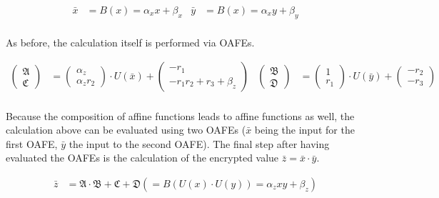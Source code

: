 \begin{align*}
  \bar{x} & = B(x) = \alpha_x x + \beta_x &
  \bar{y} & = B(x) = \alpha_x y + \beta_y \\
\end{align*}

\noindent{}As before, the calculation itself is performed via OAFEs.

\begin{align*}
\begin{pmatrix}\mathfrak{A}\\\mathfrak{C}\end{pmatrix} & =
\begin{pmatrix}\alpha_z\\\alpha_z r_2\end{pmatrix} \cdot U(\bar{x}) +
\begin{pmatrix}-r_1\\-r_1r_2+r_3+\beta_z\end{pmatrix} &
\begin{pmatrix}\mathfrak{B}\\\mathfrak{D}\end{pmatrix} & =
\begin{pmatrix}1\\r_1\end{pmatrix} \cdot U(\bar{y}) +
\begin{pmatrix}-r_2\\-r_3\end{pmatrix}\\
\end{align*}

\noindent{}Because the composition of affine functions leads to affine functions
as well, the calculation above can be evaluated using two OAFEs ($\bar{x}$ being
the input for the first OAFE, $\bar{y}$ the input to the second OAFE). The final
step after having evaluated the OAFEs is the calculation of the encrypted value
$\bar{z} = \bar{x} \cdot \bar{y}$.

\begin{align*}
  \bar{z} & = \mathfrak{A} \cdot \mathfrak{B} + \mathfrak{C} + \mathfrak{D}
  (= B(U(x) \cdot U(y)) = \alpha_z xy + \beta_z)\\
\end{align*}

